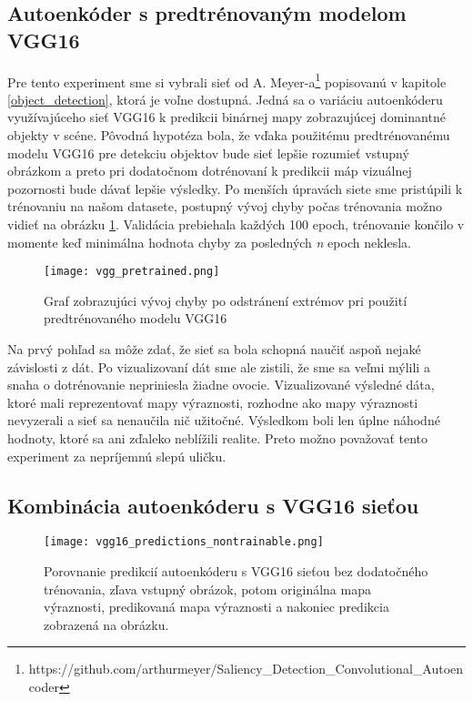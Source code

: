 \subsection{Autoenkóder s predtrénovaným modelom VGG16}
\label{experiments_vgg_net}

Pre tento experiment sme si vybrali sieť od A. Meyer-a\footnote{https://github.com/arthurmeyer/Saliency\_Detection\_Convolutional\_Autoencoder} popisovanú v kapitole \ref{object_detection}, ktorá je voľne dostupná. Jedná sa o variáciu autoenkóderu využívajúceho sieť VGG16 k predikcii binárnej mapy zobrazujúcej dominantné objekty v scéne. Pôvodná hypotéza bola, že vďaka použitému predtrénovanému modelu VGG16 pre detekciu objektov bude sieť lepšie rozumieť vstupný obrázkom a preto pri dodatočnom dotrénovaní k predikcii máp vizuálnej pozornosti bude dávať lepšie výsledky. Po menších úpravách siete sme pristúpili k trénovaniu na našom datasete, postupný vývoj chyby počas trénovania možno vidieť na obrázku \ref{vgg_pretrained_loss}. Validácia prebiehala každých 100 epoch, trénovanie končilo v momente keď minimálna hodnota chyby za posledných \textit{n} epoch neklesla. 
 
\begin{figure}[H]
	\begin{center}
		\texttt{[image: vgg\_pretrained.png]}
		\caption[Vývoj chyby počas trénovanie siete s predtrénovaným modelom VGG16]{
			Graf zobrazujúci vývoj chyby po odstránení extrémov pri použití predtrénovaného modelu VGG16 
		}\label{vgg_pretrained_loss}
	\end{center}
\end{figure}

Na prvý pohľad sa môže zdať, že sieť sa bola schopná naučiť aspoň nejaké závislosti z dát. Po vizualizovaní dát sme ale zistili, že sme sa veľmi mýlili a snaha o dotrénovanie nepriniesla žiadne ovocie. Vizualizované výsledné dáta, ktoré mali reprezentovať mapy výraznosti, rozhodne ako mapy výraznosti nevyzerali a sieť sa nenaučila nič užitočné. Výsledkom boli len úplne náhodné hodnoty, ktoré sa ani zďaleko neblížili realite. Preto možno považovať tento experiment za nepríjemnú slepú uličku.

\subsection{Kombinácia autoenkóderu s VGG16 sieťou}


\begin{figure}[H]
	\begin{center}
		\texttt{[image: vgg16\_predictions\_nontrainable.png]}
		\caption[Porovnanie predikcií autoenkóderu s VGG16 sieťou bez dodatočného trénovania voči reálnym mapám výraznosti]{
			Porovnanie predikcií autoenkóderu s VGG16 sieťou bez dodatočného trénovania, zľava vstupný obrázok, potom originálna mapa výraznosti, predikovaná mapa výraznosti a nakoniec predikcia zobrazená na obrázku.
		}\label{vgg16_predictions_nontrainable}
	\end{center}
\end{figure}

